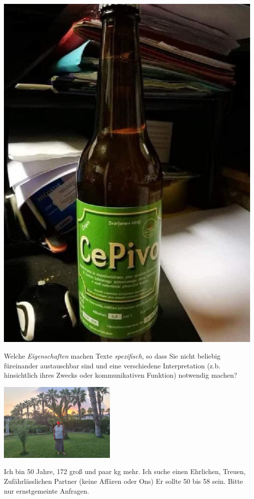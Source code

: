 \documentclass[
  letterpaper,
]{scrbook}
\begin{document}
\includegraphics[width=1\textwidth,height=\textheight]{./pictures/CePivo.jpg}

Welche \emph{Eigenschaften} machen Texte \emph{spezifisch}, so dass Sie
nicht beliebig füreinander austauschbar sind und eine verschiedene
Interpretation (z.b. hinsichtlich ihres Zwecks oder kommunikativen
Funktion) notwendig machen?

\includegraphics[width=2.26in,height=\textheight]{./pictures/partnerschaftsanzeige.png}

Ich bin 50 Jahre, 172 groß und paar kg mehr. Ich suche einen Ehrlichen,
Treuen, Zufährlässlichen Partner (keine Affären oder Ons) Er sollte 50
bis 58 sein. Bitte nur ernstgemeinte Anfragen.
\end{document}
